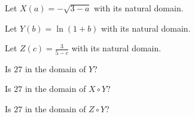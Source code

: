 \documentclass{ximera}
\begin{document}
\begin{example}


Let $X(a) = -\sqrt{3 - a}$ with its natural domain.


Let $Y(b) = \ln(1 + b)$ with its natural domain.


Let $Z(c) = \frac{3}{5 - c}$ with its natural domain.



\begin{question}

Is $27$ in the domain of $Y$?

\begin{multipleChoice}
\end{multipleChoice}

\end{question}





\begin{question}

Is $27$ in the domain of $X \circ Y$?

\begin{multipleChoice}
\end{multipleChoice}

\end{question}



\begin{question}

Is $27$ in the domain of $Z \circ Y$?

\begin{multipleChoice}
\end{multipleChoice}

\end{question}




\end{example}
\end{document}
